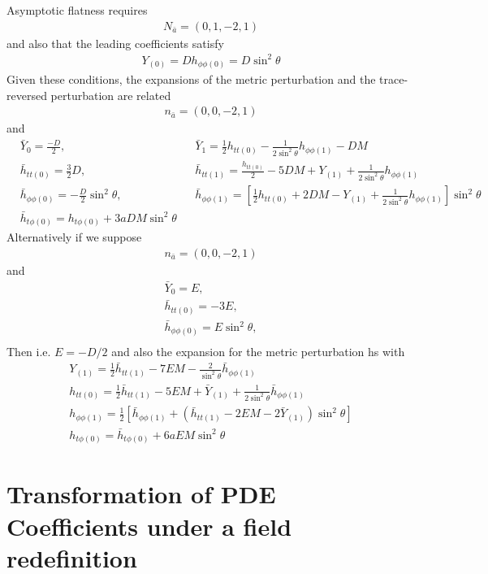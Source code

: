 \documentclass[aps,prd,amsmath,showpacs,amssymb,superscriptaddress,nofootinbib,longbibliography,eqsecnum,preprintnumbers]{revtex4-1}
\begin{document}
Asymptotic flatness requires
\begin{align}
N_{\bar a}=(0,1,-2,1)
\end{align}
and also that the leading coefficients satisfy 
\begin{align}
Y_{(0)} =D
h_{\phi\phi(0)}=D\sin^2\theta
\end{align}
Given these conditions, the expansions of the metric perturbation and the trace-reversed perturbation are related
\begin{align}
n_{\bar a}=(0,0,-2,1)
\end{align}
and
\begin{align}
&\bar Y_{0}=\frac{-D}{2},& 
&\bar Y_{1}=\frac{1}{2}h_{tt(0)}-\frac{1}{2\sin^2\theta}h_{\phi\phi(1)}-DM& \nonumber \\
&\bar h_{tt(0)}=\frac{3}{2}D,& 
&\bar h_{tt(1)}=\frac{h_{tt(0)}}{2}-5D M+Y_{(1)}+\frac{1}{2\sin^2\theta}h_{\phi\phi(1)}& \nonumber \\
&\bar h_{\phi\phi(0)}=-\frac{D}{2}\sin^2\theta,& &\bar h_{\phi\phi(1)}=\left[\frac{1}{2}h_{tt(0)}+2DM-Y_{(1)}+\frac{1}{2\sin^2\theta}h_{\phi\phi(1)}\right]\sin^2\theta& \nonumber \\
&\bar h_{t\phi(0)}= h_{t\phi(0)}+3aD M\sin^2\theta&
\end{align}
Alternatively if we suppose
\begin{align}
n_{\bar a}=(0,0,-2,1)
\end{align}
and
\begin{align}
&\bar Y_{0}=E,&  \nonumber \\	
&\bar h_{tt(0)}=-3E,& \nonumber \\
&\bar h_{\phi\phi(0)}=E\sin^2\theta,& \nonumber \\
\end{align}
Then i.e. $E=-D/2$ and also the expansion for the metric perturbation hs
with
\begin{align}
&Y_{(1)}=\frac{1}{2}\bar h_{tt(1)}-7EM-\frac{2}{\sin^2\theta}\bar h_{\phi\phi(1)} \nonumber \\
&h_{tt(0)}=\frac{1}{2}\bar h_{tt(1)}-5EM+\bar Y_{(1)}+\frac{1}{2\sin^2\theta} \bar h_{\phi\phi(1)} \nonumber \\
&h_{\phi\phi(1)}=\frac{1}{2}\left[\bar h_{\phi\phi(1)}+\left(\bar h_{tt(1)}-2EM-2\bar Y_{(1)}\right)\sin^2\theta\right] \nonumber \\
&h_{t\phi(0)}= \bar h_{t\phi(0)}+6aEM\sin^2\theta&
\end{align}

\section{Transformation of PDE Coefficients under a field redefinition}
\end{document}
